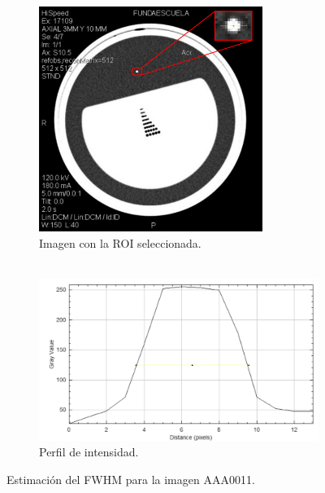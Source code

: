 \documentclass[11pt,twocolumn,twoside]{opticajnl}
\begin{document}
\begin{figure}[h]
    \centering
         \begin{subfigure}[h]{0.49\linewidth}
            \centering
            \includegraphics[width=0.8\textwidth]{Figuras/roi_zoom_corte11.png}
            \caption{Imagen con la ROI seleccionada. \\
            $~$} 
         \end{subfigure}
         \begin{subfigure}[h]{0.49\linewidth}
            \centering
            \includegraphics[width=1.1\textwidth]{Figuras/profile_corte11.png}
            \caption{Perfil de intensidad.}
         \end{subfigure}
    \caption{Estimación del FWHM para la imagen AAA0011.}
    \label{fig:FWHM}
\end{figure}
\end{document}
